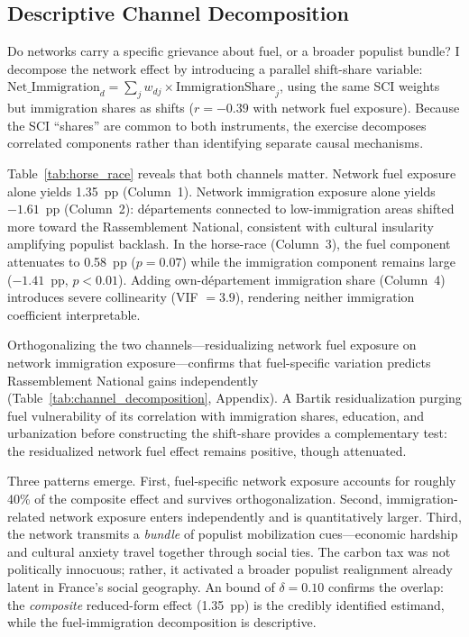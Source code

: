 \documentclass[12pt]{article}
\newcommand{\rn}{Rassemblement National}
\newcommand{\dept}{d\'{e}partement}
\newcommand{\depts}{d\'{e}partements}
\begin{document}
\subsection{Descriptive Channel Decomposition}
\label{sec:horse_race}

Do networks carry a specific grievance about fuel, or a broader populist bundle? I decompose the network effect by introducing a parallel shift-share variable: $\text{Net\_Immigration}_d = \sum_j w_{dj} \times \text{ImmigrationShare}_j$, using the same SCI weights but immigration shares as shifts ($r = -0.39$ with network fuel exposure). Because the SCI ``shares'' are common to both instruments, the exercise decomposes correlated components rather than identifying separate causal mechanisms.

Table~\ref{tab:horse_race} reveals that both channels matter. Network fuel exposure alone yields 1.35~pp (Column~1). Network immigration exposure alone yields $-1.61$~pp (Column~2): \depts{} connected to low-immigration areas shifted more toward the \rn{}, consistent with cultural insularity amplifying populist backlash. In the horse-race (Column~3), the fuel component attenuates to 0.58~pp ($p = 0.07$) while the immigration component remains large ($-1.41$~pp, $p < 0.01$). Adding own-\dept{} immigration share (Column~4) introduces severe collinearity (VIF $= 3.9$), rendering neither immigration coefficient interpretable.



Orthogonalizing the two channels---residualizing network fuel exposure on network immigration exposure---confirms that fuel-specific variation predicts \rn{} gains independently (Table~\ref{tab:channel_decomposition}, Appendix). A Bartik residualization purging fuel vulnerability of its correlation with immigration shares, education, and urbanization before constructing the shift-share provides a complementary test: the residualized network fuel effect remains positive, though attenuated.

Three patterns emerge. First, fuel-specific network exposure accounts for roughly 40\% of the composite effect and survives orthogonalization. Second, immigration-related network exposure enters independently and is quantitatively larger. Third, the network transmits a \emph{bundle} of populist mobilization cues---economic hardship and cultural anxiety travel together through social ties. The carbon tax was not politically innocuous; rather, it activated a broader populist realignment already latent in France's social geography. An \citet{oster2019unobservable} bound of $\delta = 0.10$ confirms the overlap: the \emph{composite} reduced-form effect (1.35~pp) is the credibly identified estimand, while the fuel-immigration decomposition is descriptive.
\end{document}
